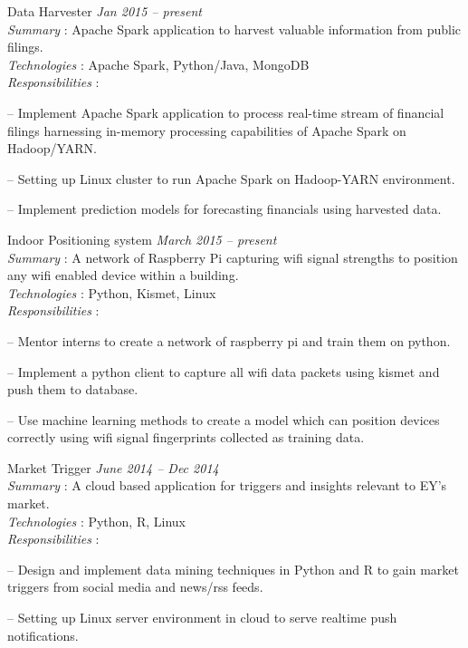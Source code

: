 \documentclass[margin,line]{resume}
\begin{document}
\begin{resume}
Data Harvester				 				\hfill \textit{Jan 2015 -- present} \\ 
\textit{Summary} : Apache Spark application to harvest valuable information from public filings. \\
      \textit{Technologies} : Apache Spark, Python/Java, MongoDB\\
\textit{Responsibilities} : 
     	 	\begin{list2}
\item[--]Implement Apache Spark application to process real-time stream of financial filings harnessing 
 in-memory processing capabilities of Apache Spark on Hadoop/YARN.
	\item[--] Setting up Linux cluster to run Apache Spark on Hadoop-YARN environment.%
	\item[--] Implement prediction models for forecasting financials using harvested data.
	\end{list2}

    Indoor Positioning system				 \hfill \textit{March 2015 -- present} \\
\textit{Summary} : A network of Raspberry Pi capturing wifi signal strengths to position any wifi enabled device within a building. 	 \\
      \textit{Technologies} : Python, Kismet, Linux\\
      \textit{Responsibilities} : 
     	 	\begin{list2}
\item[--] Mentor interns to create a network of raspberry pi and train them on python.
\item[--] Implement a python client to capture all wifi data packets using kismet and push them to database. 
\item[--] Use machine learning methods to create a model which can position devices correctly using wifi signal fingerprints collected as training data.
	\end{list2}
	
    Market Trigger				 \hfill  \textit{June 2014 -- Dec 2014} \\ 
\textit{Summary} : A cloud based application for triggers and insights relevant to EY's market.	 \\
      \textit{Technologies} : Python, R, Linux\\
      \textit{Responsibilities} : 
     	 	\begin{list2}
\item[--] Design and implement data mining techniques in Python and R to gain market triggers from
social media and news/rss feeds.	
	\item[--] Setting up Linux server environment in cloud to serve realtime push notifications.
	\end{list2}


\end{resume}
\end{document}
